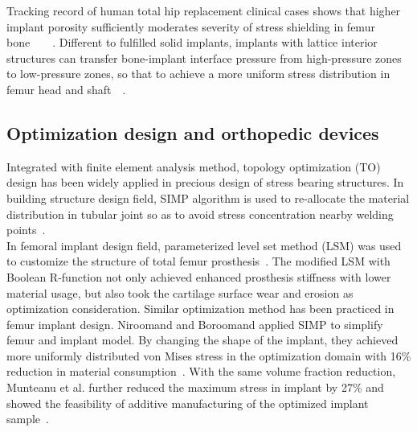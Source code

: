 \documentclass[12pt]{extbook}
\begin{document}
Tracking record of human total hip replacement clinical cases shows that higher implant porosity sufficiently moderates severity of stress shielding in femur bone~\cite{khanoki2013fatigue}~\cite{arabnejad2012multiscale}~\cite{wang2018hip}~\cite{arabnejad2017fully}. Different to fulfilled solid implants, implants with lattice interior structures can transfer bone-implant interface pressure from high-pressure zones to low-pressure zones, so that to achieve a more uniform stress distribution in femur head and shaft~\cite{wang2018hip}~\cite{arabnejad2017fully}.\\

\subsection{Optimization design and orthopedic devices}

Integrated with finite element analysis method, topology optimization (TO) design has been widely applied in precious design of stress bearing structures. In building structure design field, SIMP algorithm is used to re-allocate the material distribution in tubular joint so as to avoid stress concentration nearby welding points~\cite{huang2021integrated}.\\

In femoral implant design field, parameterized level set method (LSM) was used to customize the structure of total femur prosthesis~\cite{deng2015topology}. The modified LSM with Boolean R-function not only achieved enhanced prosthesis stiffness with lower material usage, but also took the cartilage surface wear and erosion as optimization consideration. Similar optimization method has been practiced in femur implant design. Niroomand and Boroomand applied SIMP to simplify femur and implant model. By changing the shape of the implant, they achieved more uniformly distributed von Mises stress in the optimization domain with 16\% reduction in material consumption~\cite{niroomand2018application}. With the same volume fraction reduction, Munteanu et al. further reduced the maximum stress in implant by 27\% and showed the feasibility of additive manufacturing of the optimized implant sample~\cite{munteanu2019additively}.\\
\end{document}
